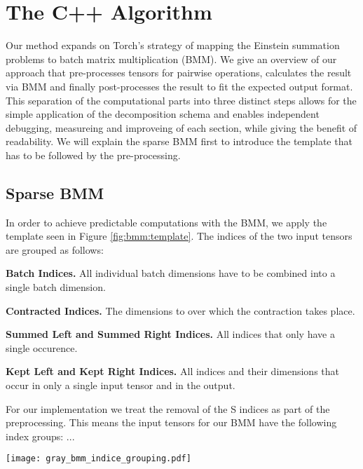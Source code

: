 \section{The C++ Algorithm}
Our method expands on Torch's strategy of mapping the Einstein summation problems to batch matrix
multiplication (BMM). We give an overview of our approach that pre-processes tensors for pairwise
operations, calculates the result via BMM and finally post-processes the result to fit the expected
output format. This separation of the computational parts into three distinct steps allows for the
simple application of the decomposition schema and enables independent debugging, measureing and
improveing of each section, while giving the benefit of readability. We will explain the sparse
BMM first to introduce the template that has to be followed by the pre-processing.

\subsection{Sparse BMM}
In order to achieve predictable computations with the BMM, we apply the template seen in Figure
\ref{fig:bmm:template}. The indices of the two input tensors are grouped as follows:

\begin{description}
    \item \textbf{Batch Indices.} All individual batch dimensions have to be combined into a single
          batch dimension.
    \item \textbf{Contracted Indices.} The dimensions to over which the contraction takes place.
    \item \textbf{Summed Left and Summed Right Indices.} All indices that only have a single occurence.
    \item \textbf{Kept Left and Kept Right Indices.} All indices and their dimensions that occur in only
          a single input tensor and in the output.
\end{description}
%
For our implementation we treat the removal of the S indices as part of the preprocessing. This means
the input tensors for our BMM have the following index groups: ...
\begin{center}
    \label{fig:bmm:template}
    \texttt{[image: gray\_bmm\_indice\_grouping.pdf]}
\end{center}

